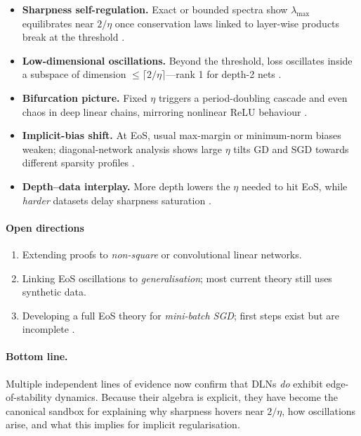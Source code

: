 \documentclass[11pt]{article}
\begin{document}
\begin{itemize}
\item \textbf{Sharpness self-regulation.}  Exact or bounded spectra show
      $\lambda_{\max}$ equilibrates near $2/\eta$ once conservation laws
      linked to layer-wise products break at the threshold
      \citep{Ghosh2025DeepMF}.%
\item \textbf{Low-dimensional oscillations.}  Beyond the threshold, loss
      oscillates inside a subspace of dimension
      $\le\lceil2/\eta\rceil$—rank 1 for depth-2 nets
      \citep{Li2022SharpnessEoS}.%
\item \textbf{Bifurcation picture.}  Fixed $\eta$ triggers a
      period-doubling cascade and even chaos in deep linear chains,
      mirroring nonlinear ReLU behaviour
      \citep{Ghosh2025DeepMF,Kalra2023Universal}.%
\item \textbf{Implicit-bias shift.}  At EoS, usual max-margin or
      minimum-norm biases weaken; diagonal-network analysis shows large
      $\eta$ tilts GD and SGD towards different sparsity profiles
      \citep{Labarriere2024DiagonalDLN}.%
\item \textbf{Depth–data interplay.}  More depth lowers the $\eta$
      needed to hit EoS, while \emph{harder} datasets delay sharpness
      saturation \citep{Yoo2025SingleNeuron}.%
\end{itemize}

\paragraph{Open directions}

\begin{enumerate}
\item Extending proofs to \emph{non-square} or convolutional linear
      networks. 
\item Linking EoS oscillations to \emph{generalisation}; most current
      theory still uses synthetic data. 
\item Developing a full EoS theory for \emph{mini-batch SGD}; first
      steps exist but are incomplete \citep{Kalra2023Universal}. 
\end{enumerate}

\paragraph{Bottom line.}
Multiple independent lines of evidence now confirm that DLNs \emph{do}
exhibit edge-of-stability dynamics.  Because their algebra is explicit,
they have become the canonical sandbox for explaining why sharpness
hovers near $2/\eta$, how oscillations arise, and what this implies for
implicit regularisation.
\end{document}
